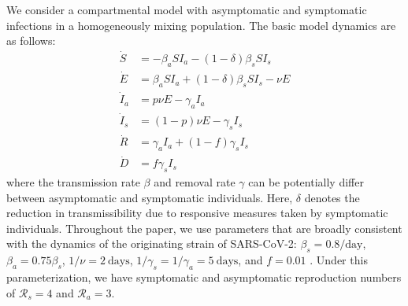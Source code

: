 \documentclass[12pt]{article}
\newcommand{\RR}{\ensuremath{{\mathcal R}}\xspace}
\begin{document}
We consider a compartmental model with asymptomatic and symptomatic infections in a homogeneously mixing population.
The basic model dynamics are as follows:
\begin{align}
\dot{S} &= -\beta_a S I_a -(1-\delta) \beta_s S I_s \\
\dot{E} &= \beta_a S I_a + (1-\delta) \beta_s S I_s - \nu E\\
\dot{I}_a &= p \nu E - \gamma_a I_a\\
\dot{I}_s &= (1-p) \nu E -\gamma_s I_s\\
\dot{R} &= \gamma_a I_a + (1-f) \gamma_s I_s \\
\dot{D} &= f \gamma_s I_s
\end{align}
where the transmission rate $\beta$ and removal rate $\gamma$ can be potentially differ between asymptomatic and symptomatic individuals.  
Here, $\delta$ denotes the reduction in transmissibility due to responsive measures taken by symptomatic individuals.
Throughout the paper, we use parameters that are broadly consistent with the dynamics of the originating strain of SARS-CoV-2: $\beta_s = 0.8/\mathrm{day}$, $\beta_a = 0.75 \beta_s$, $1/\nu=2\ \mathrm{days}$, $1/\gamma_s=1/\gamma_a=5\ \mathrm{days}$, and $f=0.01$ \cite{park2020reconciling}.
Under this parameterization, we have symptomatic and asymptomatic reproduction numbers of $\RR_s = 4$ and $\RR_a = 3$.
\end{document}
